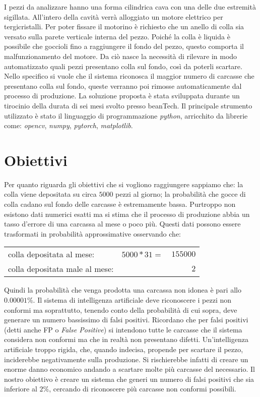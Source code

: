 \documentclass[a0,portrait]{a0poster}
\begin{document}
\begin{multicols}{2}
I pezzi da analizzare hanno una forma cilindrica cava con una delle due estremità sigillata.
All'intero della cavità verrà alloggiato un motore elettrico per tergicristalli.
Per poter fissare il motorino è richiesto che un anello di colla sia versato sulla parete verticale interna del pezzo.
Poiché la colla è liquida è possibile che goccioli fino a raggiungere il fondo del pezzo, questo comporta il malfunzionamento del motore.
Da ciò nasce la necessità di rilevare in modo automatizzato quali pezzi presentano colla sul fondo, così da poterli scartare.
Nello specifico si vuole che il sistema riconosca il maggior numero di carcasse che presentano colla sul fondo, queste verranno poi rimosse automaticamente dal processo di produzione.
La soluzione proposta è stata sviluppata durante un tirocinio della durata di sei mesi svolto presso beanTech.
Il principale strumento utilizzato è stato il linguaggio di programmazione \textit{python}, arricchito da librerie come: \textit{opencv}, \textit{numpy}, \textit{pytorch}, \textit{matplotlib}.


\color{DarkSlateGray} %
\section*{Obiettivi}
Per quanto riguarda gli obiettivi che si vogliono raggiungere sappiamo che:
la colla viene depositata su circa $5000$ pezzi al giorno;
la probabilità che gocce di colla cadano sul fondo delle carcasse è estremamente bassa.
Purtroppo non esistono dati numerici esatti ma si stima che il processo di produzione abbia un tasso d'errore di una carcassa al mese o poco più.
Questi dati possono essere trasformati in probabilità approssimative osservando che:
\begin{center}
  \begin{tabular}{ l c r }
    colla depositata al mese: & $5000 * 31 =$& $155000$ \\
    colla depositata male al mese: && $2$
  \end{tabular}
\end{center}
Quindi la probabilità che venga prodotta una carcassa non idonea è pari allo $0.00001\%$.
Il sistema di intelligenza artificiale deve riconoscere i pezzi non conformi ma soprattutto, tenendo conto della probabilità di cui sopra, deve generare un numero bassissimo di falsi positivi.
Ricordano che per falsi positivi (detti anche FP o \textit{False Positive}) si intendono tutte le carcasse che il sistema considera non conformi ma che in realtà non presentano difetti.
Un'intelligenza artificiale troppo rigida, che, quando indecisa, propende per scartare il pezzo, inciderebbe negativamente sulla produzione.
Si rischierebbe infatti di creare un enorme danno economico andando a scartare molte più carcasse del necessario.
Il nostro obiettivo è creare un sistema che generi un numero di falsi positivi che sia inferiore al $2\%$, cercando di riconoscere più carcasse non conformi possibili.



\end{multicols}
\end{document}
